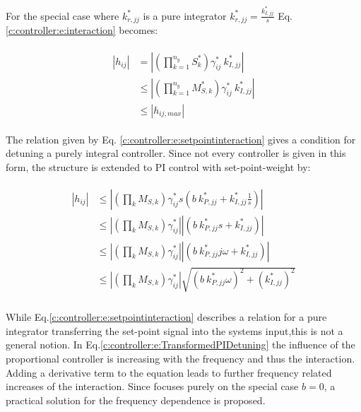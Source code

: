 For the special case where $k^*_{r,jj}$ is a pure integrator $k_{r,jj}^* = \frac{k_{I,jj}^*}{s}$ Eq. \ref{c:controller:e:interaction} becomes:

\begin{align}
\begin{split}
\left| h_{ij} \right| &= \left|\left(\prod_{k = 1}^{n_y} S_k^*\right) \gamma^*_{ij}~ k^*_{I,jj} \right| \\
& \leq \left|\left(\prod_{k = 1}^{n_y} M_{S,k}^*\right) \gamma^*_{ij}~ k^*_{I,jj} \right| \\
& \leq \left|h_{ij,max}\right|
\end{split}
\label{c:controller:e:setpointinteraction}
\end{align}

The relation given by Eq. \ref{c:controller:e:setpointinteraction} gives a condition for detuning a purely integral controller. Since not every controller is given in this form, the structure is extended to PI control with set-point-weight by:

\begin{align}
\begin{split}
\left|h_{ij}\right| &\leq \left| \left(\prod_k M_{S,k} \right) \gamma_{ij}^* s \left(b~k_{P,jj}^* + k_{I,jj}^* \frac{1}{s} \right) \right| \\
&\leq \left| \left(\prod_k M_{S,k} \right) \gamma_{ij}^*\right| \left|\left(b~k_{P,jj}^* s+ k_{I,jj}^* \right) \right| \\
&\leq \left| \left(\prod_k M_{S,k} \right) \gamma_{ij}^*\right| \left|\left(b~k_{P,jj}^* j\omega+ k_{I,jj}^* \right) \right| \\
&\leq \left| \left(\prod_k M_{S,k} \right) \gamma_{ij}^*\right| \sqrt{\left(b~k_{P,jj}^*\omega\right)^2+ \left(k_{I,jj}^*\right)^2} \\
\end{split}
\label{c:controller:e:TransformedPIDetuning}
\end{align}

While Eq.\ref{c:controller:e:setpointinteraction} describes a relation for a pure integrator transferring the set-point signal into the systems input,this is not a general notion. In Eq.\ref{c:controller:e:TransformedPIDetuning} the influence of the proportional controller is increasing with the frequency and thus the interaction. Adding a derivative term to the equation leads to further frequency related increases of the interaction. Since \cite{Astrom2001a} focuses purely on the special case $b=0$, a practical solution for the frequency dependence is proposed.\\

